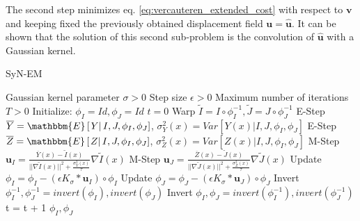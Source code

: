 The second step minimizes eq. \eqref{eq:vercauteren_extended_cost} with respect to $\mathbf{v}$ and keeping fixed the previously obtained displacement field $\mathbf{u}=\widehat{\mathbf{u}}$. It can be shown that the solution of this second sub-problem is the convolution of $\widehat{\mathbf{u}}$ with a Gaussian kernel\cite{Vercauteren2009}.\\

\begin{algorithm}[h!]
\caption{SyN-EM}\label{alg:SyNEM}
\begin{algorithmic}[1]
\REQUIRE Gaussian kernel parameter $\sigma>0$
\REQUIRE Step size $\epsilon>0$
\REQUIRE Maximum number of iterations $T>0$
\STATE Initialize: $\phi_{I} = Id, \phi_{J} = Id$
\STATE $t=0$
\REPEAT
    \STATE Warp $\tilde{I}  = I \circ \phi_{I}^{-1}, \tilde{J} = J \circ \phi_{J}^{-1}$
    \STATE E-Step $\overline{Y} = \mathbbm{E}\left[\left.Y\right| I, J, \phi_{I}, \phi_{J}\right]$, $\sigma^{2}_{Y}(x) = Var\left[\left.Y(x)\right| I, J, \phi_{I}, \phi_{J}\right]$
    \STATE E-Step $\overline{Z} = \mathbbm{E}\left[\left.Z\right| I, J, \phi_{I}, \phi_{J}\right]$, $\sigma^{2}_{Z}(x) = Var\left[\left.Z(x)\right| I, J, \phi_{I}, \phi_{J}\right]$
    \STATE M-Step $\mathbf{u}_{I} = \frac{\overline{Y}(x) - \tilde{I}(x)}{||\nabla \tilde{I}(x)||^{2} + \frac{\sigma_{Y}^{2}(x)}{\tau}}\nabla \tilde{I}(x)$
    \STATE M-Step $\mathbf{u}_{J} = \frac{\overline{Z}(x) - \tilde{J}(x)}{||\nabla \tilde{J}(x)||^{2} + \frac{\sigma_{Z}^{2}(x)}{\tau}}\nabla \tilde{J}(x)$
    \STATE Update $\phi_{I} = \phi_{I} - \left(\epsilon K_{\sigma} \ast \mathbf{u}_{I} \right)\circ \phi_{I}$
    \STATE Update $\phi_{J} = \phi_{J} - \left(\epsilon K_{\sigma} \ast \mathbf{u}_{J} \right)\circ \phi_{J}$
    \STATE Invert $\phi_{I}^{-1}, \phi_{J}^{-1} = invert(\phi_{I}), invert(\phi_{J})$
    \STATE Invert $\phi_{I}, \phi_{J} = invert(\phi_{I}^{-1}), invert(\phi_{J}^{-1})$
    \STATE t = t + 1
\RETURN $\phi_{I}, \phi_{J}$
\end{algorithmic}
\end{algorithm}


